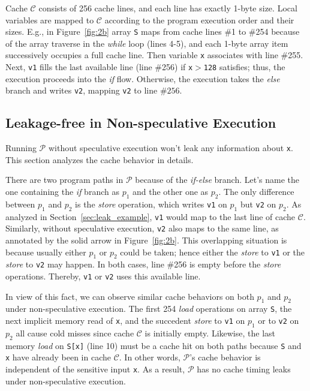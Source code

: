 \documentclass[sigconf]{acmart}
\newcommand{\prog}{\mathcal{P}}
\begin{document}
Cache $\mathcal{C}$ consists of 256 cache lines, and each line has exactly 
1-byte size. Local variables are mapped to $\mathcal{C}$ according to the 
program execution order and their sizes. E.g., in Figure~\ref{fig:2b} array 
\texttt{S} maps from cache lines \#1 to \#254 because of the array traverse 
in the \emph{while} loop (lines 4-5), and each 1-byte array item successively 
occupies a full cache line. Then variable \texttt{x} associates with line 
\#255. Next, \texttt{v1} fills the last available line (line \#256) if 
\texttt{x}$>$\texttt{128} satisfies; thus, the execution proceeds into the 
\textit{if} flow. Otherwise, the execution takes the \textit{else} branch 
and writes \texttt{v2}, mapping \texttt{v2} to line $\#256$.




\subsection{Leakage-free in Non-speculative Execution}
\label{sec:no_leak}

Running $\prog$ without speculative execution won't leak any information 
about \texttt{x}. This section analyzes the cache behavior in details. 


There are two program paths in $\prog$ because of the \textit{if-else} 
branch. Let's name the one containing the \textit{if} branch as $p_1$ 
and the other one as $p_2$. The only difference between $p_1$ and $p_2$
is the \emph{store} operation, which writes \texttt{v1} on $p_1$ but 
\texttt{v2} on $p_2$. As analyzed in Section~\ref{sec:leak_example}, 
\texttt{v1} would map to the last line of cache $\mathcal{C}$. Similarly, 
without speculative execution, \texttt{v2} also maps to the same line, as 
annotated by the solid arrow in Figure~\ref{fig:2b}. This overlapping 
situation is because usually either $p_1$ or $p_2$ could be taken; 
hence either the \textit{store} to \texttt{v1} or the \textit{store} 
to \texttt{v2} may happen. In both cases, line \#256 is empty before 
the \textit{store} operations. Thereby, \texttt{v1} or \texttt{v2} 
uses this available line.


In view of this fact, we can observe similar cache behaviors on both $p_1$ 
and $p_2$ under non-speculative execution. The first 254 \emph{load} 
operations on array \texttt{S}, the next implicit memory read of \texttt{x},
and the succedent \textit{store} to \texttt{v1} on $p_1$ or to \texttt{v2} 
on $p_2$ all cause cold misses since cache $\mathcal{C}$ is initially empty. 
Likewise, the last memory \emph{load} on \texttt{S[x]} (line 10) must be a 
cache hit on both paths because \texttt{S} and \texttt{x} have already been 
in cache $\mathcal{C}$. In other words, $\prog$'s cache behavior is 
independent of the sensitive input \texttt{x}. As a result, $\prog$ has no 
cache timing leaks under non-speculative execution.
\end{document}
